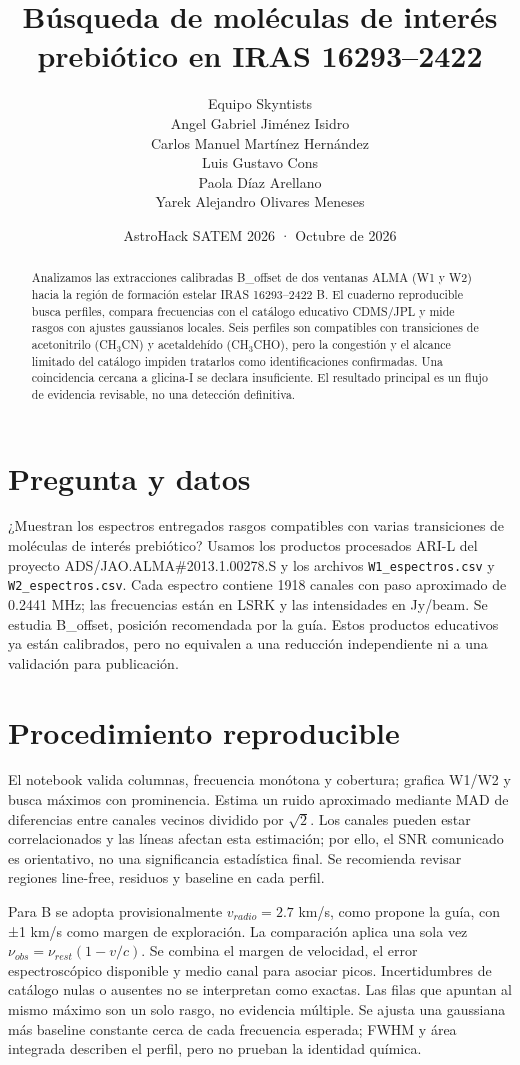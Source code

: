 \documentclass[10pt]{article}
\title{Búsqueda de moléculas de interés prebiótico en IRAS 16293--2422}
\author{Equipo Skyntists\\Angel Gabriel Jiménez Isidro\\Carlos Manuel Martínez Hernández\\Luis Gustavo Cons\\Paola Díaz Arellano\\\small Yarek Alejandro Olivares Meneses}
\date{AstroHack SATEM 2026 · Octubre de 2026}
\begin{document}
\maketitle
\vspace{-1.2em}
\begin{abstract}
Analizamos las extracciones calibradas B\_offset de dos ventanas ALMA (W1 y W2) hacia la región de formación estelar IRAS 16293--2422 B. El cuaderno reproducible busca perfiles, compara frecuencias con el catálogo educativo CDMS/JPL y mide rasgos con ajustes gaussianos locales. Seis perfiles son compatibles con transiciones de acetonitrilo (CH$_3$CN) y acetaldehído (CH$_3$CHO), pero la congestión y el alcance limitado del catálogo impiden tratarlos como identificaciones confirmadas. Una coincidencia cercana a glicina-I se declara insuficiente. El resultado principal es un flujo de evidencia revisable, no una detección definitiva.
\end{abstract}

\section{Pregunta y datos}
¿Muestran los espectros entregados rasgos compatibles con varias transiciones de moléculas de interés prebiótico? Usamos los productos procesados ARI-L del proyecto ADS/JAO.ALMA\#2013.1.00278.S y los archivos \texttt{W1\_espectros.csv} y \texttt{W2\_espectros.csv}. Cada espectro contiene 1918 canales con paso aproximado de 0.2441 MHz; las frecuencias están en LSRK y las intensidades en Jy/beam. Se estudia B\_offset, posición recomendada por la guía. Estos productos educativos ya están calibrados, pero no equivalen a una reducción independiente ni a una validación para publicación.

\section{Procedimiento reproducible}
El notebook valida columnas, frecuencia monótona y cobertura; grafica W1/W2 y busca máximos con prominencia. Estima un ruido aproximado mediante MAD de diferencias entre canales vecinos dividido por $\sqrt{2}$. Los canales pueden estar correlacionados y las líneas afectan esta estimación; por ello, el SNR comunicado es orientativo, no una significancia estadística final. Se recomienda revisar regiones line-free, residuos y baseline en cada perfil.

Para B se adopta provisionalmente $v_{radio}=2.7$ km/s, como propone la guía, con ±1 km/s como margen de exploración. La comparación aplica una sola vez $\nu_{obs}=\nu_{rest}(1-v/c)$. Se combina el margen de velocidad, el error espectroscópico disponible y medio canal para asociar picos. Incertidumbres de catálogo nulas o ausentes no se interpretan como exactas. Las filas que apuntan al mismo máximo son un solo rasgo, no evidencia múltiple. Se ajusta una gaussiana más baseline constante cerca de cada frecuencia esperada; FWHM y área integrada describen el perfil, pero no prueban la identidad química.
\end{document}
